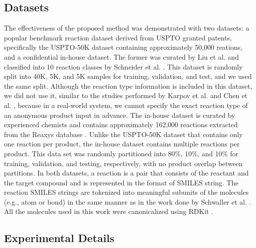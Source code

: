 \documentclass[journal=jacsat,manuscript=article]{achemso}
\begin{document}
	\subsection{Datasets}
	
	The effectiveness of the proposed method was demonstrated with two datasets: a popular benchmark reaction dataset derived from USPTO granted patents, specifically the USPTO-50K dataset containing approximately 50,000 reations, and a confidential in-house dataset.
	The former was curated by Liu et al. \cite{liu2017retrosynthetic} and classified into 10 reaction classes by Schneider et al. \cite{schneider2016s}. This dataset is randomly split into 40K, 5K, and 5K samples for training, validation, and test, and we used the same split. Although the reaction type information is included in this dataset, we did not use it, similar to the studies performed by Karpov et al. \cite{karpov2019transformer} and Chen et al. \cite{chen2019learning}, because in a real-world system, we cannot specify the exact reaction type of an anonymous product input in advance. The in-house dataset is curated by experienced chemists and contains approximately 162,000 reactions extracted from the Reaxys database \cite{reaxys}. Unlike the USPTO-50K dataset that contains only one reaction per product, the in-house dataset contains multiple reactions per product. This data set was randomly partitioned into 80\%, 10\%, and 10\% for training, validation, and testing, respectively, with no product overlap between partitions. In both datasets, a reaction is a pair that consists of the reactant and the target compound and is represented in the format of SMILES string. The reaction SMILES strings are tokenized into meaningful subunits of the molecules (e.g., atom or bond) in the same manner as in the work done by Schwaller et al. \cite{schwaller2019molecular}. All the molecules used in this work were canonicalized using RDKit \cite{landrum2006rdkit}.
	
	
	\subsection{Experimental Details}
	
\end{document}

